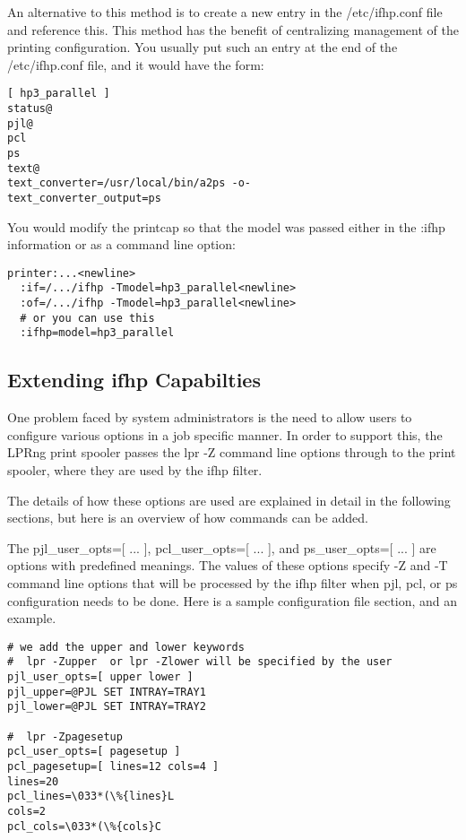 \documentclass[a4paper]{article}
\begin{document}
An alternative to this method is to create a new entry in the
{\ttfamily /etc/ifhp.conf}
file and reference this.
This method has the benefit of centralizing management of the
printing configuration.
You usually put such an entry at the end of the
{\ttfamily /etc/ifhp.conf}
file,
and it would have the form:
\begin{tscreen}
\begin{verbatim}
[ hp3_parallel ]
status@
pjl@
pcl
ps
text@
text_converter=/usr/local/bin/a2ps -o-
text_converter_output=ps
\end{verbatim}
\end{tscreen}


You would modify the printcap so that the model was passed
either in the
{\ttfamily :ifhp} information or as a command line option:
\begin{tscreen}
\begin{verbatim}
printer:...<newline>
  :if=/.../ifhp -Tmodel=hp3_parallel<newline>
  :of=/.../ifhp -Tmodel=hp3_parallel<newline>
  # or you can use this
  :ifhp=model=hp3_parallel
\end{verbatim}
\end{tscreen}



\subsection{Extending ifhp Capabilties
\label{ps_user_opts}
\label{pcl_user_opts}}

One problem faced by system administrators
is the need to allow users to configure various options in a job
specific manner.
In order to support this,
the LPRng print spooler passes the
{\ttfamily lpr -Z}
command line options through to the print spooler,
where they are used by the
{\ttfamily ifhp}
filter.

The details of how these options are used are explained in detail
in the following sections,
but here is an overview of how commands can be added.

The
{\ttfamily pjl\_user\_opts=[ ... ]},
{\ttfamily pcl\_user\_opts=[ ... ]},
and
{\ttfamily ps\_user\_opts=[ ... ]}
are options with predefined meanings.
The values of these options specify
{\ttfamily -Z}
and
{\ttfamily -T}
command line options that will be processed by the
{\ttfamily ifhp}
filter when
{\ttfamily pjl}, {\ttfamily pcl}, or {\ttfamily ps} configuration needs to be done.
Here is a sample configuration file section,
and an example.
\begin{tscreen}
\begin{verbatim}
# we add the upper and lower keywords
#  lpr -Zupper  or lpr -Zlower will be specified by the user
pjl_user_opts=[ upper lower ]
pjl_upper=@PJL SET INTRAY=TRAY1
pjl_lower=@PJL SET INTRAY=TRAY2

#  lpr -Zpagesetup
pcl_user_opts=[ pagesetup ]
pcl_pagesetup=[ lines=12 cols=4 ]
lines=20
pcl_lines=\033*(\%{lines}L
cols=2
pcl_cols=\033*(\%{cols}C
\end{verbatim}
\end{tscreen}
\end{document}
